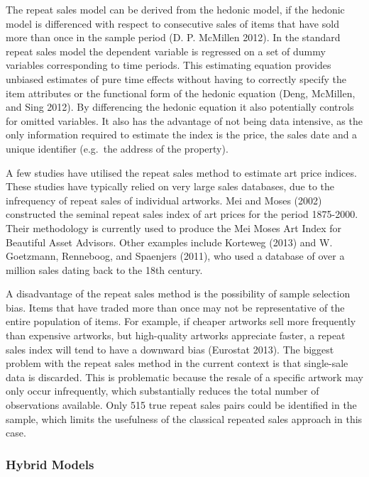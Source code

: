 \documentclass[]{elsarticle} %
\begin{document}
The repeat sales model can be derived from the hedonic model, if the
hedonic model is differenced with respect to consecutive sales of items
that have sold more than once in the sample period (D. P. McMillen
2012). In the standard repeat sales model the dependent variable is
regressed on a set of dummy variables corresponding to time periods.
This estimating equation provides unbiased estimates of pure time
effects without having to correctly specify the item attributes or the
functional form of the hedonic equation (Deng, McMillen, and Sing 2012).
By differencing the hedonic equation it also potentially controls for
omitted variables. It also has the advantage of not being data
intensive, as the only information required to estimate the index is the
price, the sales date and a unique identifier (e.g.~the address of the
property).

A few studies have utilised the repeat sales method to estimate art
price indices. These studies have typically relied on very large sales
databases, due to the infrequency of repeat sales of individual
artworks. Mei and Moses (2002) constructed the seminal repeat sales
index of art prices for the period 1875-2000. Their methodology is
currently used to produce the Mei Moses Art Index for Beautiful Asset
Advisors. Other examples include Korteweg (2013) and W. Goetzmann,
Renneboog, and Spaenjers (2011), who used a database of over a million
sales dating back to the 18th century.

A disadvantage of the repeat sales method is the possibility of sample
selection bias. Items that have traded more than once may not be
representative of the entire population of items. For example, if
cheaper artworks sell more frequently than expensive artworks, but
high-quality artworks appreciate faster, a repeat sales index will tend
to have a downward bias (Eurostat 2013). The biggest problem with the
repeat sales method in the current context is that single-sale data is
discarded. This is problematic because the resale of a specific artwork
may only occur infrequently, which substantially reduces the total
number of observations available. Only 515 true repeat sales pairs could
be identified in the sample, which limits the usefulness of the
classical repeated sales approach in this case.

\subsubsection{Hybrid Models}\label{hybrid-models}
\end{document}
